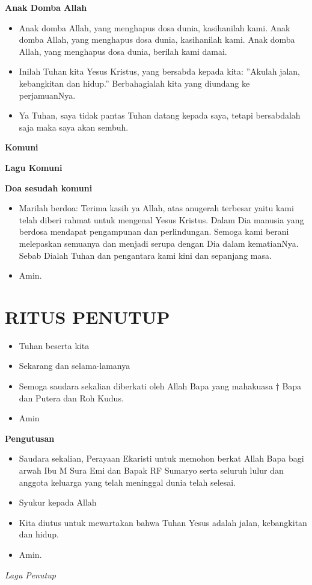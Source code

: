 \documentclass[a5paper,headsepline,titlepage,12pt,nnormalheadings,DIVcalc,twoside]{scrbook}
\makeatletter
\newcommand{\subjudul}[1]{%
  {\parindent \z@ 
    \interlinepenalty\@M \bfseries #1\par\nobreak \vskip 10\p@ }}
\newcommand{\lagu}[1]{%
  {\parindent \z@ 
    \interlinepenalty\@M \slshape \mdseries \Large \textit{#1}\par\nobreak \vskip 10\p@ }}
\newcommand{\BU}[1]{\begin{itemize} \item[U:] #1 \end{itemize}}
\newcommand{\BI}[1]{\begin{itemize} \item[I:] #1 \end{itemize}}
\makeatother
\begin{document}
\subjudul{Anak Domba Allah}

\BU{Anak domba Allah, yang menghapus dosa dunia, 
kasihanilah kami. Anak domba Allah, yang menghapus 
dosa dunia, kasihanilah kami. Anak domba Allah, yang 
menghapus dosa dunia, berilah kami damai.}

\BI{Inilah Tuhan kita Yesus Kristus, yang bersabda kepada 
kita: ”Akulah jalan, kebangkitan dan hidup.” 
Berbahagialah kita yang diundang ke perjamuanNya.}

\BU{Ya Tuhan, saya tidak pantas Tuhan datang kepada saya, 
tetapi bersabdalah saja maka saya akan sembuh.}

\subjudul{Komuni}

\subjudul{Lagu Komuni}

 

\subjudul{Doa sesudah komuni}

\BI{Marilah berdoa: Terima kasih ya Allah, atas anugerah 
terbesar yaitu kami telah diberi rahmat untuk mengenal 
Yesus Kristus. Dalam Dia manusia yang berdosa mendapat 
pengampunan dan perlindungan. Semoga kami berani 
melepaskan semuanya dan menjadi serupa dengan Dia 
dalam kematianNya. Sebab Dialah Tuhan dan pengantara 
kami kini dan sepanjang masa.}

\BU{Amin.}

 

\section*{RITUS PENUTUP}

\BI{Tuhan beserta kita}

\BU{Sekarang dan selama-lamanya}

\BI{Semoga saudara sekalian diberkati oleh Allah Bapa yang 
mahakuasa † Bapa dan Putera dan Roh Kudus.}

\BU{Amin}

 

\subjudul{Pengutusan}

\BI{Saudara sekalian, Perayaan Ekaristi untuk memohon 
berkat Allah Bapa bagi arwah Ibu M Sura Emi dan Bapak 
RF Sumaryo serta seluruh lulur dan anggota keluarga yang 
telah meninggal dunia telah selesai.}

\BU{Syukur kepada Allah}

\BI{Kita diutus untuk mewartakan bahwa Tuhan Yesus adalah 
jalan, kebangkitan dan hidup.}

\BU{Amin.}

 

\lagu{Lagu Penutup}

\end{document}
